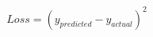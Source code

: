 \documentclass[preview]{standalone}
\begin{document}
\begin{align*}
Loss = (y_{predicted} - y_{actual})^2
\end{align*}
\end{document}
